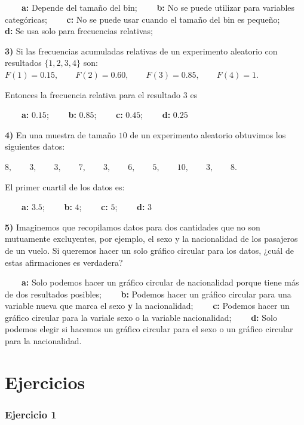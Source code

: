 \documentclass[
]{book}
\begin{document}
\textbf{\(\qquad\)a:} Depende del tamaño del bin; \textbf{\(\qquad\)b:} No se puede utilizar para variables categóricas;
\textbf{\(\qquad\)c:} No se puede usar cuando el tamaño del bin es pequeño;
\textbf{\(\qquad\)d:} Se usa solo para frecuencias relativas;

\textbf{3)} Si las frecuencias acumuladas relativas de un experimento aleatorio con resultados \(\{1,2,3,4\}\) son: \(F(1)=0.15, \qquad F(2)=0.60, \qquad F(3)=0.85, \qquad F(4)=1\).

Entonces la frecuencia relativa para el resultado \(3\) es

\textbf{\(\qquad\)a:} \(0.15\); \textbf{\(\qquad\)b:} \(0.85\); \textbf{\(\qquad\)c:} \(0.45\); \textbf{\(\qquad\)d:} \(0.25\)

\textbf{4)} En una muestra de tamaño \(10\) de un experimento aleatorio obtuvimos los siguientes datos:

\(8,\qquad 3,\qquad 3,\qquad 7,\qquad 3,\qquad 6,\qquad 5,\qquad 10,\qquad 3,\qquad 8\).

El primer cuartil de los datos es:

\textbf{\(\qquad\)a:} \(3.5\); \textbf{\(\qquad\)b:} \(4\); \textbf{\(\qquad\)c:} \(5\); \textbf{\(\qquad\)d:} \(3\)

\textbf{5)} Imaginemos que recopilamos datos para dos cantidades que no son mutuamente excluyentes, por ejemplo, el sexo y la nacionalidad de los pasajeros de un vuelo. Si queremos hacer un solo gráfico circular para los datos, ¿cuál de estas afirmaciones es verdadera?

\textbf{\(\qquad\)a:} Solo podemos hacer un gráfico circular de nacionalidad porque tiene más de dos resultados posibles; \textbf{\(\qquad\)b:} Podemos hacer un gráfico circular para una variable nueva que marca el sexo \textbf{y} la nacionalidad; \textbf{\(\qquad\)c:} Podemos hacer un gráfico circular para la variale sexo o la variable nacionalidad; \textbf{\(\qquad\)d:} Solo podemos elegir si hacemos un gráfico circular para el sexo o un gráfico circular para la nacionalidad.

\hypertarget{ejercicios}{%
\section{Ejercicios}\label{ejercicios}}

\hypertarget{ejercicio-1}{%
\subsubsection{Ejercicio 1}\label{ejercicio-1}}
\end{document}
